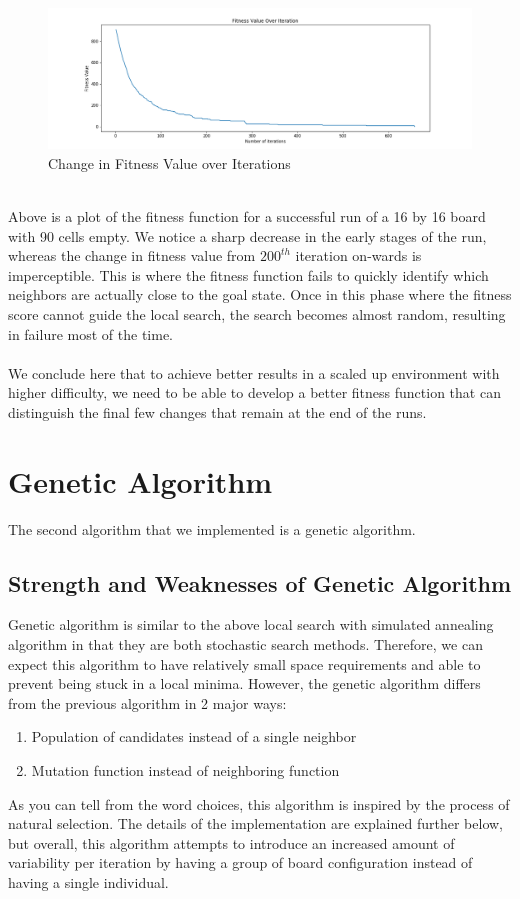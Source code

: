 \documentclass[12pt, a4paper]{article}
\begin{document}
			\begin{figure}[h]
				\begin{center} 
					\includegraphics[width=7in]{16_100_iteration.png}
					\caption{Change in Fitness Value over Iterations} 
				\end{center} 
			\end{figure}\\
			Above is a plot of the fitness function for a successful run of a 16 by 16 board with 90 cells empty. We notice a sharp decrease in the early stages of the run, whereas the change in fitness value from $200^{th}$ iteration on-wards is imperceptible. This is where the fitness function fails to quickly identify which neighbors are actually close to the goal state. Once in this phase where the fitness score cannot guide the local search, the search becomes almost random, resulting in failure most of the time.\\\\
			We conclude here that to achieve better results in a scaled up environment with higher difficulty, we need to be able to develop a better fitness function that can distinguish the final few changes that remain at the end of the runs.
	\section{Genetic Algorithm}
		The second algorithm that we implemented is a genetic algorithm. 
		\subsection{Strength and Weaknesses of Genetic Algorithm}
			Genetic algorithm is similar to the above local search with simulated annealing algorithm in that  they are both stochastic search methods. Therefore, we can expect this algorithm to have relatively small space requirements and able to prevent being stuck in a local minima. However, the genetic algorithm differs from the previous algorithm in 2 major ways:
			\begin{enumerate}
				\item Population of candidates instead of a single neighbor
				\item Mutation function instead of neighboring function
			\end{enumerate}
			As you can tell from the word choices, this algorithm is inspired by the process of natural selection. The details of the implementation are explained further below, but overall, this algorithm attempts to introduce an increased amount of variability per iteration by having a group of board configuration instead of having a single individual.
\end{document}
